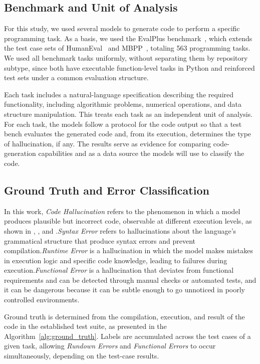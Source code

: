 \subsection{Benchmark and Unit of Analysis}
For this study, we used several models to generate code to perform a specific programming task. As a basis, we used the EvalPlus benchmark~\citep{liu2023evalplus}, which extends the test case sets of HumanEval~\citep{chen2021humaneval} and MBPP~\citep{austin2021mbpp}, totaling 563 programming tasks. We used all benchmark tasks uniformly, without separating them by repository subtype, since both have executable function-level tasks in Python and reinforced test sets under a common evaluation structure.

Each task includes a natural-language specification describing the required functionality, including algorithmic problems, numerical operations, and data structure manipulation. This treats each task as an independent unit of analysis. For each task, the models follow a protocol for the code output so that a test bench evaluates the generated code and, from its execution, determines the type of hallucination, if any. The results serve as evidence for comparing code-generation capabilities and as a data source the models will use to classify the code.

\subsection{Ground Truth and Error Classification}

In this work, \emph{Code Hallucination} refers to the phenomenon in which a model produces plausible but incorrect code, observable at different execution levels, as shown in \citet{pavel2025hallucination}, \citet{lee2025hallucination}, and \citet{dou2025whatswrong}.\emph{Syntax Error} refers to hallucinations about the language's grammatical structure that produce syntax errors and prevent compilation.\emph{Runtime Error} is a hallucination in which the model makes mistakes in execution logic and specific code knowledge, leading to failures during execution.\emph{Functional Error} is a hallucination that deviates from functional requirements and can be detected through manual checks or automated tests, and it can be dangerous because it can be subtle enough to go unnoticed in poorly controlled environments.

Ground truth is determined from the compilation, execution, and result of the code in the established test suite, as presented in the Algorithm~\ref{alg:ground_truth}. Labels are accumulated across the test cases of a given task, allowing \emph{Rundown Errors} and \emph{Functional Errors} to occur simultaneously, depending on the test-case results.


